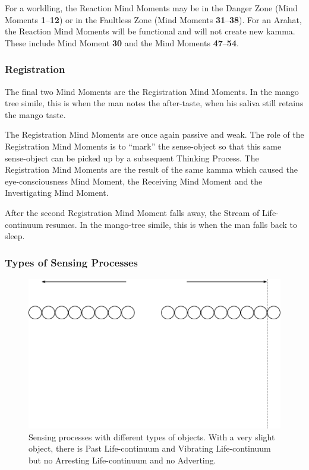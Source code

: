 For a worldling, the Reaction Mind Moments may be in the Danger Zone (Mind Moments \textbf{1}--\textbf{12}) or in the Faultless Zone (Mind Moments \textbf{31}--\textbf{38}). For an Arahat, the Reaction Mind Moments will be functional and will not create new kamma. These include Mind Moment \textbf{30} and the Mind Moments \textbf{47}--\textbf{54}.

\subsubsection*{Registration}

The final two Mind Moments are the Registration Mind Moments. In the mango tree simile, this is when the man notes the after-taste, when his saliva still retains the mango taste.

The Registration Mind Moments are once again passive and weak. The role of the Registration Mind Moments is to “mark” the sense-object so that this same sense-object can be picked up by a subsequent Thinking Process. The Registration Mind Moments are the result of the same kamma which caused the eye-consciousness Mind Moment, the Receiving Mind Moment and the Investigating Mind Moment.

After the second Registration Mind Moment falls away, the Stream of Life-continuum resumes. In the mango-tree simile, this is when the man falls back to sleep.

\subsubsection*{Types of Sensing Processes}

\begin{figure}[h]
\centering
\includegraphics[width=1\linewidth]{./Diagrams/Process1}
\caption{Sensing processes with different types of objects. With a very slight object, there is Past Life-continuum and Vibrating Life-continuum but no Arresting Life-continuum and no Adverting.}
\label{fig:Process1}
\end{figure}

